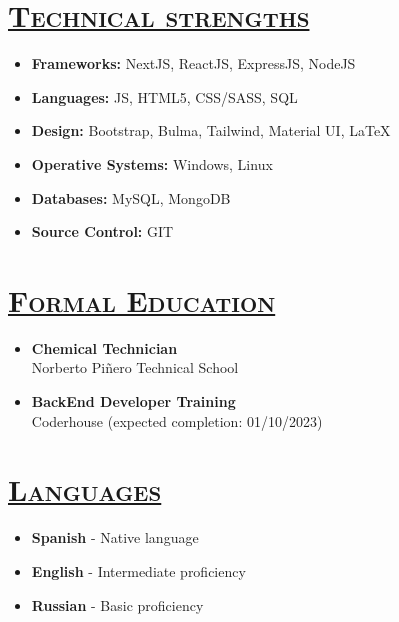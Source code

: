 \documentclass{resume} %
\begin{document}
\vspace{-5px}
\begin{multicols}{2}
  
    \section*{\textsc{\underline{Technical strengths}}}
    \begin{itemize}
    \setlength\itemsep{-15px}
        \item \textbf{Frameworks:} NextJS, ReactJS, ExpressJS, NodeJS\\
        \item \textbf{Languages:} JS, HTML5, CSS/SASS, SQL\\
        \item \textbf{Design:} Bootstrap, Bulma, Tailwind, Material UI, \LaTeX\\
        \item \textbf{Operative Systems:} Windows, Linux\\
        \item \textbf{Databases:} MySQL, MongoDB\\
        \item \textbf{Source Control:} GIT\\
    \end{itemize}

    
    \columnbreak

    \section*{\textsc{\underline{Formal Education}}}

    \begin{itemize}
      \setlength\itemsep{-15px}
      \item \textbf{Chemical Technician}\\\textcolor{light-gray}{Norberto Pi\~nero Technical School}
    \end{itemize}

    \begin{itemize}
      \setlength\itemsep{-15px}
      \item \textbf{BackEnd Developer Training}\\\textcolor{light-gray}{Coderhouse (expected completion: 01/10/2023)}
    \end{itemize}

    \vspace{-15px}
    \section*{\textsc{\underline{Languages}}}
    \begin{itemize}
      \setlength\itemsep{-10px}
        \item \textbf{Spanish} - \textcolor{light-gray}{Native language}
        \item \textbf{English} - \textcolor{light-gray}{Intermediate proficiency}
        \item \textbf{Russian} - \textcolor{light-gray}{Basic proficiency}
      \end{itemize}


\end{multicols}
\end{document}
